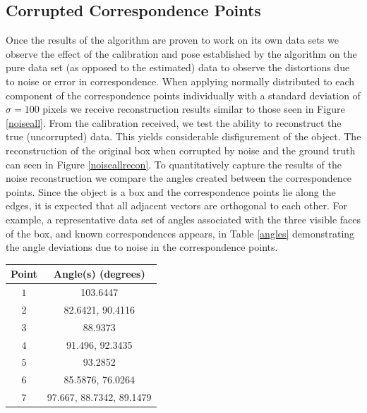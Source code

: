 \documentclass[12pt]{article}
\begin{document}
\subsection{Corrupted Correspondence Points}
 Once the results of the algorithm are proven to work on its own data sets we observe the effect of the calibration and pose established by the algorithm on the pure data set (as opposed to the estimated) data to observe the distortions due to noise or error in correspondence. When applying normally distributed to each component of the correspondence points individually with a standard deviation of $\sigma = 100$ pixels we receive reconstruction results similar to those seen in Figure \ref{noiseall}. From the calibration received, we test the ability to reconstruct the true (uncorrupted) data. This yields considerable disfigurement of the object. The reconstruction of the original box when corrupted by noise and the ground truth can seen in Figure \ref{noiseallrecon}.  To quantitatively capture the results of the noise reconstruction we compare the angles created between the correspondence points. Since the object is a box and the correspondence points lie along the edges, it is expected that all adjacent vectors are orthogonal to each other. For example, a representative data set of angles associated with the three visible faces of the box, and known correspondences appears, in Table \ref{angles} demonstrating the angle deviations due to noise in the correspondence points.
	\begin{center}
	\begin{tabular}[5pt]{| c| c|}
		\hline
		Point	& Angle(s) (degrees) \\[0.5ex] 
		\hline 	
		$1$& 103.6447 \\ \hline 
		$2$& 82.6421, 90.4116  \\ \hline 
		$3$& 88.9373  \\ \hline 
		$4$& 91.496, 92.3435  \\ \hline 
		$5$& 93.2852  \\ \hline 
		$6$& 85.5876, 76.0264  \\ \hline 
		$7$& 97.667, 88.7342, 89.1479  \\ \hline 
	\end{tabular}
	\label{angles}
\end{center}	
\end{document}
